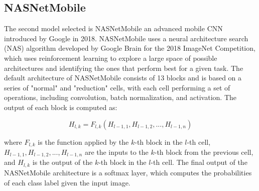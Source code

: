 \documentclass[conference]{IEEEtran}
\begin{document}



\subsection{NASNetMobile}
The second model selected is NASNetMobile an advanced mobile CNN introduced by Google in 2018. NASNetMobile uses a neural architecture search (NAS) algorithm developed by Google Brain for the 2018 ImageNet Competition, which uses reinforcement learning to explore a large space of possible architectures and identifying the ones that perform best for a given task. The default architecture of NASNetMobile consists of 13 blocks and is based on a series of "normal" and "reduction" cells, with each cell performing a set of operations, including convolution, batch normalization, and activation. The output of each block is computed as:

\begin{equation}
H_{l,k} = F_{l,k}(H_{l-1,1},H_{l-1,2},...,H_{l-1,n})
\end{equation}

where $F_{l,k}$ is the function applied by the $k$-th block in the $l$-th cell, $H_{l-1,1},H_{l-1,2},...,H_{l-1,n}$ are the inputs to the $k$-th block from the previous cell, and $H_{l,k}$ is the output of the $k$-th block in the $l$-th cell. The final output of the NASNetMobile architecture is a softmax layer, which computes the probabilities of each class label given the input image.
\end{document}
